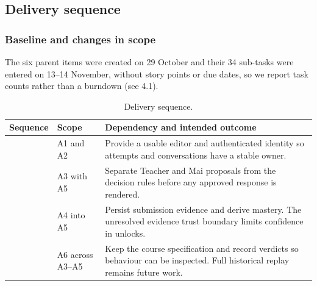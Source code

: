 \documentclass[11pt,a4paper]{article}
\begin{document}
\subsection{Delivery sequence}
\subsubsection{Baseline and changes in scope}
The six parent items were created on 29 October and their 34 sub-tasks were entered on 13--14 November, without story points or due dates, so we report task counts rather than a burndown (see 4.1).

{\small
\begin{longtable}{>{\raggedright\arraybackslash}p{}>{\raggedright\arraybackslash}p{}>{\raggedright\arraybackslash}p{}}
\caption{Delivery sequence.}\\
\toprule
\textbf{Sequence} & \textbf{Scope} & \textbf{Dependency and intended outcome} \\
\midrule
\endhead
1 & A1 and A2 & Provide a usable editor and authenticated identity so attempts and conversations have a stable owner. \\
2 & A3 with A5 & Separate Teacher and Mai proposals from the decision rules before any approved response is rendered. \\
3 & A4 into A5 & Persist submission evidence and derive mastery. The unresolved evidence trust boundary limits confidence in unlocks. \\
4 & A6 across A3--A5 & Keep the course specification and record verdicts so behaviour can be inspected. Full historical replay remains future work. \\
\bottomrule
\end{longtable}}
\end{document}
